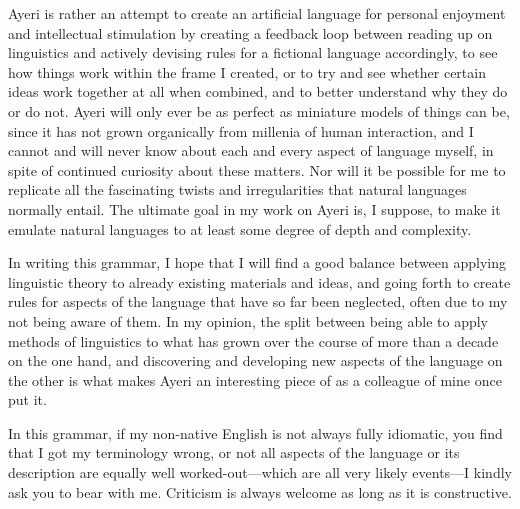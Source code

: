 Ayeri is rather an attempt to create an artificial language for personal 
enjoyment and intellectual stimulation by creating a feedback loop between 
reading up on linguistics and actively devising rules for a fictional language 
accordingly, to see how things work within the frame I created, or to try and 
see whether certain ideas work together at all when combined, and to better
understand why they do or do not. Ayeri will only ever be as perfect as 
miniature models of things can be, since it has not grown organically from 
millenia of human interaction, and I cannot and will never know about each and 
every aspect of language myself, in spite of continued curiosity about these 
matters. Nor will it be possible for me to replicate all the fascinating twists 
and irregularities that natural languages normally entail. The ultimate 
goal in my work on Ayeri is, I suppose, to make it emulate natural 
languages to at least some degree of depth and complexity.

In writing this grammar, I hope that I will find a good balance between 
applying linguistic theory to already existing materials and ideas, and going 
forth to create rules for aspects of the language that have so far been 
neglected, often due to my not being aware of them. In my opinion, the split 
between being able to apply methods of linguistics to what has grown over the 
course of more than a decade on the one hand, and discovering and developing 
new aspects of the language on the other is what makes Ayeri an interesting 
piece of  as a colleague of mine once put it.

In this grammar, if my non-native English is not always fully idiomatic, you 
find that I got my terminology wrong, or not all aspects of the language or its 
description are equally well worked-out---which are all very likely events---I 
kindly ask you to bear with me. Criticism is always welcome as long as it is 
constructive.
